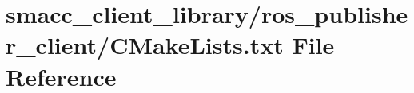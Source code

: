 \hypertarget{client__library_2ros__publisher__client_2CMakeLists_8txt}{}\section{smacc\+\_\+client\+\_\+library/ros\+\_\+publisher\+\_\+client/\+C\+Make\+Lists.txt File Reference}
\label{client__library_2ros__publisher__client_2CMakeLists_8txt}
